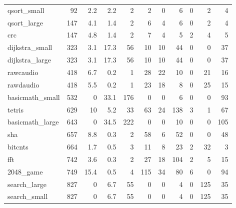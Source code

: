 \begin{tabular}{lrrrrrrrrrr}
 qsort\_small     &             92 &      2.2 &    2.2 &    2 &      2 &          0 &            6 &     0 &     2 &     4 \\
 qsort\_large     &            147 &      4.1 &    1.4 &    2 &      6 &          4 &            6 &     0 &     2 &     4 \\
 crc             &            147 &      4.8 &    1.4 &    2 &      7 &          4 &            5 &     2 &     4 &     5 \\
 dijkstra\_small  &            323 &      3.1 &   17.3 &   56 &     10 &         10 &           44 &     0 &     0 &    37 \\
 dijkstra\_large  &            323 &      3.1 &   17.3 &   56 &     10 &         10 &           44 &     0 &     0 &    37 \\
 rawcaudio       &            418 &      6.7 &    0.2 &    1 &     28 &         22 &           10 &     0 &    21 &    16 \\
 rawdaudio       &            418 &      5.5 &    0.2 &    1 &     23 &         18 &            8 &     0 &    25 &    15 \\
 basicmath\_small &            532 &      0   &   33.1 &  176 &      0 &          0 &            6 &     0 &     0 &    93 \\
 tetris          &            629 &     10   &    5.2 &   33 &     63 &         24 &          138 &     3 &     1 &    67 \\
 basicmath\_large &            643 &      0   &   34.5 &  222 &      0 &          0 &           10 &     0 &     0 &   105 \\
 sha             &            657 &      8.8 &    0.3 &    2 &     58 &          6 &           52 &     0 &     0 &    48 \\
 bitcnts         &            664 &      1.7 &    0.5 &    3 &     11 &          8 &           23 &     2 &    32 &     3 \\
 fft             &            742 &      3.6 &    0.3 &    2 &     27 &         18 &          104 &     2 &     5 &    15 \\
 2048\_game       &            749 &     15.4 &    0.5 &    4 &    115 &         34 &           80 &     6 &     0 &    94 \\
 search\_large    &            827 &      0   &    6.7 &   55 &      0 &          0 &            4 &     0 &   125 &    35 \\
 search\_small    &            827 &      0   &    6.7 &   55 &      0 &          0 &            4 &     0 &   125 &    35 \\

\end{tabular}
